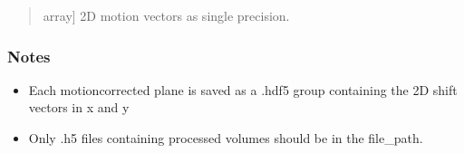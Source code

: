 \documentclass[letterpaper,10pt,english]{sphinxmanual}
\begin{document}
\begin{fulllineitems}
\begin{quote}
\begin{description}
\begin{description}
\sphinxlineitem{\sphinxstylestrong{shifts}}{[}array{]}
\sphinxAtStartPar
2D motion vectors as single precision.

\end{description}

\end{description}\end{quote}
\subsubsection*{Notes}
\begin{itemize}
\item {} 
\sphinxAtStartPar
Each motion\sphinxhyphen{}corrected plane is saved as a .hdf5 group containing the 2D
shift vectors in x and y

\item {} 
\sphinxAtStartPar
Only .h5 files containing processed volumes should be in the file\_path.

\end{itemize}

\end{fulllineitems}

\end{document}
